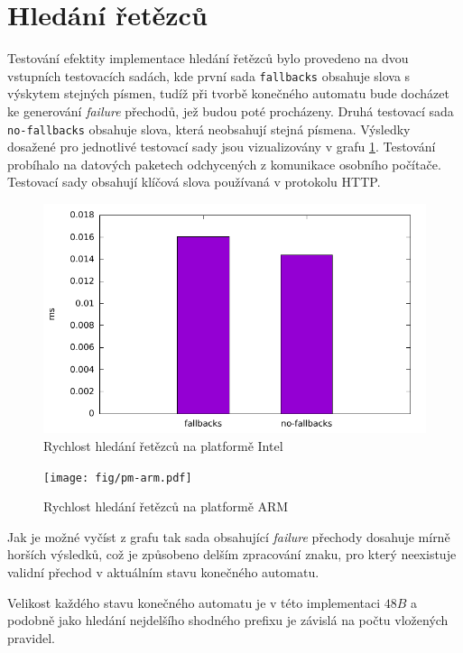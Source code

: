\section{Hledání řetězců} %
Testování efektity implementace hledání řetězců bylo provedeno na dvou vstupních testovacích sadách,
kde první sada \texttt{fallbacks} obsahuje slova s výskytem stejných písmen, tudíž při tvorbě konečného automatu bude
docházet ke generování \textit{failure} přechodů, jež budou poté procházeny. Druhá testovací sada \texttt{no-fallbacks}
obsahuje slova, která neobsahují stejná písmena. Výsledky dosažené pro jednotlivé testovací sady jsou
vizualizovány v grafu \ref{fig:pm}. Testování probíhalo na datových paketech odchycených z komunikace osobního počítače. Testovací sady obsahují klíčová slova používaná v protokolu HTTP.

\begin{figure}[!htbp]
	\centering
	\includegraphics[scale=0.7]{fig/pm.pdf}
	\caption{Rychlost hledání řetězců na platformě Intel}
    \label{fig:pm}
\end{figure}

\begin{figure}[!htbp]
    \centering
    \texttt{[image: fig/pm-arm.pdf]}
    \caption{Rychlost hledání řetězců na platformě ARM}
    \label{fig:pm-arm}
\end{figure}

Jak je možné vyčíst z grafu tak sada obsahující \textit{failure} přechody dosahuje mírně horších výsledků,
což je způsobeno delším zpracování znaku, pro který neexistuje validní přechod v aktuálním stavu konečného automatu.

Velikost každého stavu konečného automatu je v této implementaci $48B$
a podobně jako hledání nejdelšího shodného prefixu je závislá na počtu vložených pravidel.

